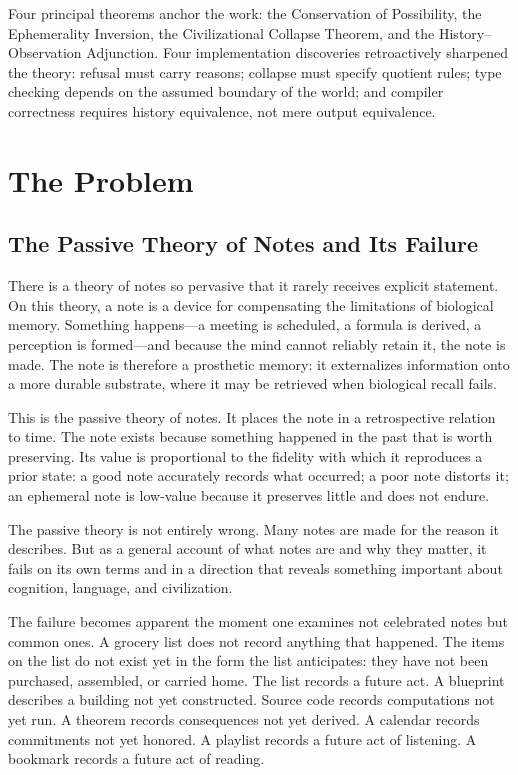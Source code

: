 \documentclass[12pt, a4paper, openany]{book}
\theoremstyle{plain}
\theoremstyle{definition}
\theoremstyle{remark}
\begin{document}
Four principal theorems anchor the work: the Conservation of Possibility, the
Ephemerality Inversion, the Civilizational Collapse Theorem, and the
History--Observation Adjunction. Four implementation discoveries retroactively
sharpened the theory: refusal must carry reasons; collapse must specify quotient
rules; type checking depends on the assumed boundary of the world; and compiler
correctness requires history equivalence, not mere output equivalence.

\newpage

\tableofcontents

\mainmatter

\part{The Problem}

\chapter{The Passive Theory of Notes and Its Failure}

There is a theory of notes so pervasive that it rarely receives explicit statement.
On this theory, a note is a device for compensating the limitations of biological
memory. Something happens---a meeting is scheduled, a formula is derived, a
perception is formed---and because the mind cannot reliably retain it, the note
is made. The note is therefore a prosthetic memory: it externalizes information
onto a more durable substrate, where it may be retrieved when biological recall
fails.

This is the passive theory of notes. It places the note in a retrospective
relation to time. The note exists because something happened in the past that is
worth preserving. Its value is proportional to the fidelity with which it
reproduces a prior state: a good note accurately records what occurred; a poor note
distorts it; an ephemeral note is low-value because it preserves little and does
not endure.

The passive theory is not entirely wrong. Many notes are made for the reason it
describes. But as a general account of what notes are and why they matter, it
fails on its own terms and in a direction that reveals something important about
cognition, language, and civilization.

The failure becomes apparent the moment one examines not celebrated notes but
common ones. A grocery list does not record anything that happened. The items on
the list do not exist yet in the form the list anticipates: they have not been
purchased, assembled, or carried home. The list records a future act. A blueprint
describes a building not yet constructed. Source code records computations not yet
run. A theorem records consequences not yet derived. A calendar records commitments
not yet honored. A playlist records a future act of listening. A bookmark records
a future act of reading.
\end{document}
